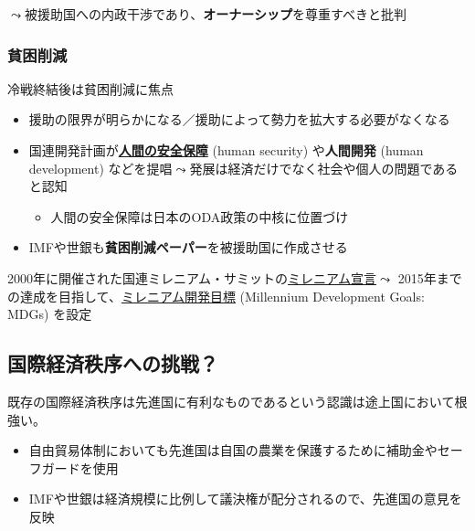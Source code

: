 \documentclass[
  xelatex,
  ja=standard]{bxjsarticle}
\providecommand{\tightlist}{%
  \setlength{\itemsep}{0pt}\setlength{\parskip}{0pt}}\usepackage{longtable,booktabs,array}
\begin{document}
\(\leadsto\)被援助国への内政干渉であり、\textbf{オーナーシップ}を尊重すべきと批判

\hypertarget{ux8ca7ux56f0ux524aux6e1b}{%
\subsubsection{貧困削減}\label{ux8ca7ux56f0ux524aux6e1b}}

冷戦終結後は貧困削減に焦点

\begin{itemize}
\tightlist
\item
  援助の限界が明らかになる／援助によって勢力を拡大する必要がなくなる
\item
  国連開発計画が\href{https://www.mofa.go.jp/mofaj/gaiko/oda/bunya/security/index.html}{\textbf{人間の安全保障}}
  (human security) や\textbf{人間開発} (human development)
  などを提唱\(\leadsto\)発展は経済だけでなく社会や個人の問題であると認知

  \begin{itemize}
  \tightlist
  \item
    人間の安全保障は日本のODA政策の中核に位置づけ
  \end{itemize}
\item
  IMFや世銀も\textbf{貧困削減ペーパー}を被援助国に作成させる
\end{itemize}

2000年に開催された国連ミレニアム・サミットの\href{https://www.mofa.go.jp/mofaj/kaidan/kiroku/s_mori/arc_00/m_summit/sengen.html}{ミレニアム宣言}\(\leadsto\)
2015年までの達成を目指して、\href{https://www.un.org/millenniumgoals/2015_MDG_Report/pdf/MDG\%202015\%20PC\%20final.pdf}{ミレニアム開発目標}
(Millennium Development Goals: MDGs) を設定

\hypertarget{ux56fdux969bux7d4cux6e08ux79e9ux5e8fux3078ux306eux6311ux6226}{%
\subsection{国際経済秩序への挑戦？}\label{ux56fdux969bux7d4cux6e08ux79e9ux5e8fux3078ux306eux6311ux6226}}

既存の国際経済秩序は先進国に有利なものであるという認識は途上国において根強い。

\begin{itemize}
\tightlist
\item
  自由貿易体制においても先進国は自国の農業を保護するために補助金やセーフガードを使用
\item
  IMFや世銀は経済規模に比例して議決権が配分されるので、先進国の意見を反映
\end{itemize}
\end{document}
